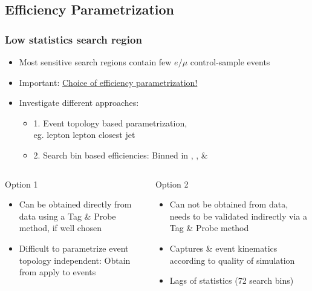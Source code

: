 \documentclass{beamer}
\begin{document}
\subsection{Efficiency Parametrization}
\begin{frame}
 \frametitle{Low statistics search region}
 \begin{itemize}
  \item Most sensitive search regions contain few $e/\mu$ control-sample events
  \item Important: \underline{Choice of efficiency parametrization!}
  \item Investigate different approaches:
  \begin{itemize}
   \item 1. Event topology based parametrization,\\ eg. \pt lepton \deltaR lepton closest jet
   \item 2. Search bin based efficiencies: Binned in \HT, \MHT, \NJets \& \BTags
  \end{itemize}
 \end{itemize}
 \noindent\makebox[\linewidth]{\rule{\textwidth}{0.4pt}}
 \begin{columns}
  \begin{column}{0.465\textwidth}
  Option 1
   \begin{itemize}
    \item Can be obtained directly from data using a Tag \& Probe method, if well chosen
    \item Difficult to parametrize event topology independent: Obtain from \Zll apply to \ttbar \wpj events
   \end{itemize}

  \end{column}
  \begin{column}{0.535\textwidth}
     Option 2
   \begin{itemize}
    \item Can not be obtained from data, needs to be validated indirectly via a Tag \& Probe method
    \item Captures \ttbar \& \wpj event kinematics according to quality of simulation
    \item Lags of statistics (72 search bins)
   \end{itemize}
  \end{column}

 \end{columns}
\end{frame}
\end{document}
